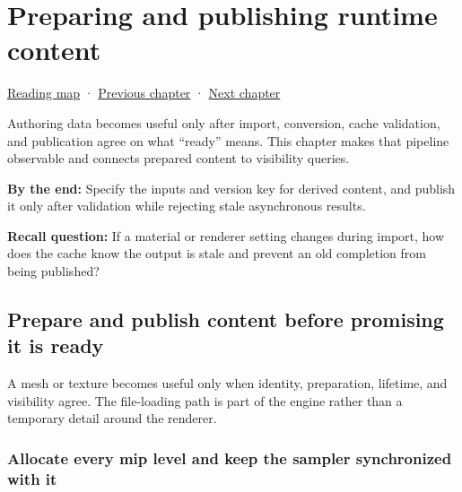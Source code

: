 \chapter{Preparing and publishing runtime content}\label{06-engine-ii-ch027-preparing-and-publishing-runtime-content}\hypertarget{06-engine-ii-ch027}{}\label{stagechapter:06-engine-ii-ch027}

\hypertarget{06-engine-ii-ch027-preparing-and-publishing-runtime-content}{}

\hyperref[volume-reading-map]{Reading map} · \hyperref[06-engine-ii-ch026-descriptor-arrays-and-backend-limits]{Previous chapter} · \hyperref[06-engine-ii-ch043]{Next chapter}

Authoring data becomes useful only after import, conversion, cache validation, and publication agree on what ``ready'' means. This chapter makes that pipeline observable and connects prepared content to visibility queries.

\textbf{By the end:} Specify the inputs and version key for derived content, and publish it only after validation while rejecting stale asynchronous results.

\textbf{Recall question:} If a material or renderer setting changes during import, how does the cache know the output is stale and prevent an old completion from being published?

\section{Prepare and publish content before promising it is ready}\label{06-engine-ii-ch027-prepare-and-publish-content-before-promising-it-is-ready}

\hypertarget{06-engine-ii-ch027-prepare-and-publish-content-before-promising-it-is-ready}{}

A mesh or texture becomes useful only when identity, preparation, lifetime, and visibility agree. The file-loading path is part of the engine rather than a temporary detail around the renderer.

\subsection{Allocate every mip level and keep the sampler synchronized with it}\label{06-engine-ii-ch027-allocate-every-mip-level-and-keep-the-sampler-synchronized-with-it}

\hypertarget{06-engine-ii-ch027-allocate-every-mip-level-and-keep-the-sampler-synchronized-with-it}{}

